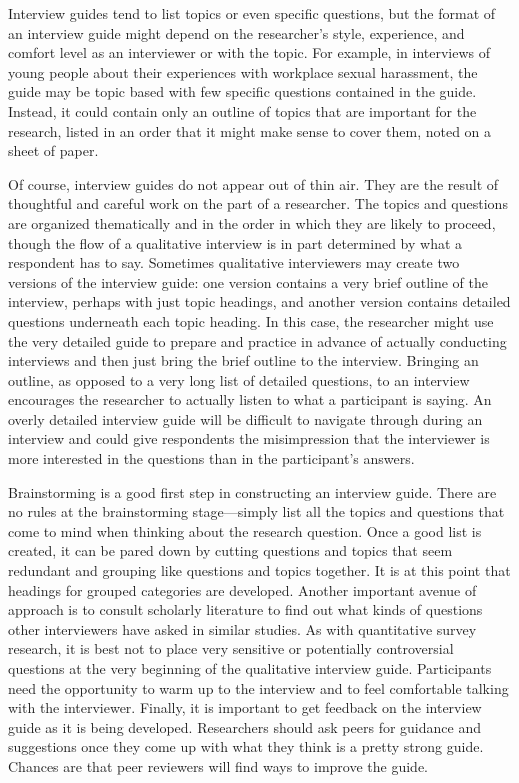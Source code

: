 Interview guides tend to list topics or even specific questions, but the format of an interview guide might depend on the researcher's style, experience, and comfort level as an interviewer or with the topic. For example, in interviews of young people about their experiences with workplace sexual harassment, the guide may be topic based with few specific questions contained in the guide. Instead, it could contain only an outline of topics that are important for the research, listed in an order that it might make sense to cover them, noted on a sheet of paper.

Of course, interview guides do not appear out of thin air. They are the result of thoughtful and careful work on the part of a researcher. The topics and questions are organized thematically and in the order in which they are likely to proceed, though the flow of a qualitative interview is in part determined by what a respondent has to say. Sometimes qualitative interviewers may create two versions of the interview guide: one version contains a very brief outline of the interview, perhaps with just topic headings, and another version contains detailed questions underneath each topic heading. In this case, the researcher might use the very detailed guide to prepare and practice in advance of actually conducting interviews and then just bring the brief outline to the interview. Bringing an outline, as opposed to a very long list of detailed questions, to an interview encourages the researcher to actually listen to what a participant is saying. An overly detailed interview guide will be difficult to navigate through during an interview and could give respondents the misimpression that the interviewer is more interested in the questions than in the participant's answers.

Brainstorming is a good first step in constructing an interview guide. There are no rules at the brainstorming stage---simply list all the topics and questions that come to mind when thinking about the research question. Once a good list is created, it can be pared down by cutting questions and topics that seem redundant and grouping like questions and topics together. It is at this point that headings for grouped categories are developed. Another important avenue of approach is to consult scholarly literature to find out what kinds of questions other interviewers have asked in similar studies. As with quantitative survey research, it is best not to place very sensitive or potentially controversial questions at the very beginning of the qualitative interview guide. Participants need the opportunity to warm up to the interview and to feel comfortable talking with the interviewer. Finally, it is important to get feedback on the interview guide as it is being developed. Researchers should ask peers for guidance and suggestions once they come up with what they think is a pretty strong guide. Chances are that peer reviewers will find ways to improve the guide.

